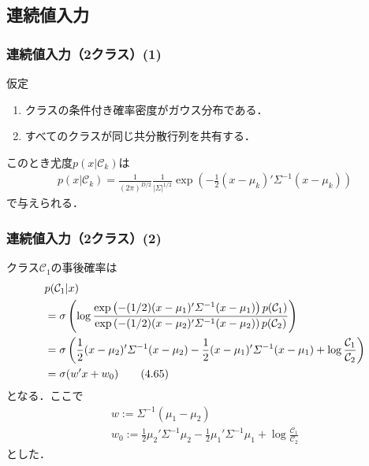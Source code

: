 \documentclass[10pt,%
hyperref={unicode}]{beamer}
\begin{document}
\subsection{連続値入力}
\begin{frame}
    \frametitle{連続値入力（2クラス）(1)}
    仮定
        \begin{enumerate}
            \item クラスの条件付き確率密度がガウス分布である．
            \item すべてのクラスが同じ共分散行列を共有する．
        \end{enumerate}

    \bigskip

    このとき尤度$p(x|\mathcal{C}_k)$は
    \begin{align}
        p(x|\mathcal{C}_k) = \frac{1}{(2\pi)^{D/2}}\frac{1}{|\varSigma|^{1/2}}
        \exp \left( - \frac{1}{2}(x - \mu_k)'\varSigma^{-1}(x - \mu_k)\right)
        \tag{4.64}
    \end{align}
    で与えられる．
\end{frame}

\begin{frame}
    \frametitle{連続値入力（2クラス）(2)}
    クラス$\mathcal{C}_1$の事後確率は
    \begin{align}
        &p(\mathcal{C}_1|x) \notag \\
        &=\sigma\left(
                \log\frac{\exp\left(-(1/2)(x - \mu_1)'\varSigma^{-1}(x - \mu_1)
                \right)p(\mathcal{C}_1)}%
                {\exp\left(-(1/2)(x - \mu_2)'\varSigma^{-1}(x - \mu_2)
                \right)p(\mathcal{C}_2)}
            \right) \notag \\
        &= \sigma\left(
            \frac{1}{2}(x - \mu_2)'\varSigma^{-1}(x - \mu_2)
            - \frac{1}{2}(x - \mu_1)'\varSigma^{-1}(x - \mu_1)
            + \log\frac{\mathcal{C}_1}{\mathcal{C}_2} \right) \notag \\
        &= \sigma(w'x + w_0) \tag{4.65} \label{sigmawx}
    \end{align}
    となる．ここで
    \begin{gather}
        w := \varSigma^{-1}(\mu_1 - \mu_2) \tag{4.66} \\
        w_0 := \frac{1}{2}\mu_2'\varSigma^{-1}\mu_2
               - \frac{1}{2}\mu_1'\varSigma^{-1}\mu_1
               + \log \frac{\mathcal{C}_1}{\mathcal{C}_2}\tag{4.67}
    \end{gather}
    とした．
\end{frame}
\end{document}
